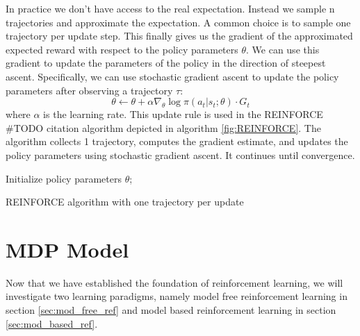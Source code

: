 In practice we don't have access to the real expectation. Instead we sample n trajectories and approximate the expectation.
A common choice is to sample one trajectory per update step. 
This finally gives us the gradient of the approximated expected reward with respect to the policy parameters $\theta$. We can use this gradient to update the parameters of the policy in the direction of steepest ascent. Specifically, we can use stochastic gradient ascent to update the policy parameters after observing a trajectory $\tau$:
\begin{equation}
    \label{reinf_update}
    \theta \leftarrow \theta + \alpha \nabla_{\theta} \log \pi(a_t|s_t;\theta) \cdot G_t
\end{equation}
where $\alpha$ is the learning rate. This update rule is used in the REINFORCE #TODO citation algorithm depicted in algorithm \ref{fig:REINFORCE}.
The algorithm collects 1 trajectory, computes the gradient estimate, and updates the policy parameters using stochastic gradient ascent. 
It continues until convergence.

\begin{algorithm}[H]
    \SetAlgoLined
        Initialize policy parameters $\theta$;
    \caption{REINFORCE algorithm with one trajectory per update}
    \label{fig:REINFORCE}
\end{algorithm}
    

\section{MDP Model}
Now that we have established the foundation of reinforcement learning, we will investigate two learning paradigms, 
namely model free reinforcement learning in section \ref{sec:mod_free_ref} and model based reinforcement learning in section \ref{sec:mod_based_ref}. \\

